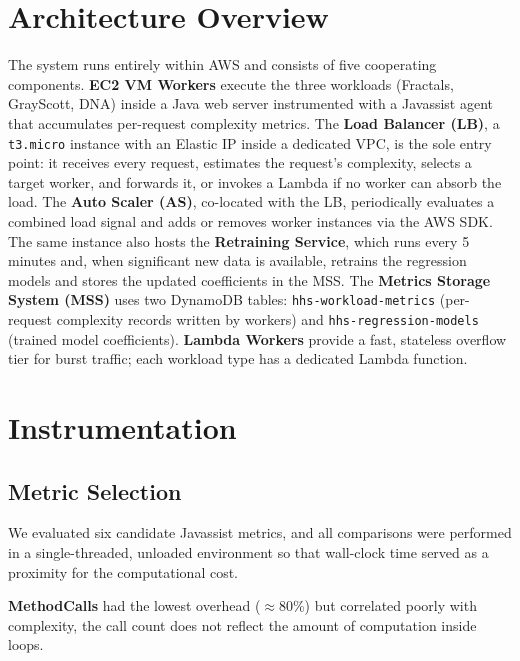 \documentclass[10pt]{article}
\begin{document}
\section{Architecture Overview}
The system runs entirely within AWS and consists of five cooperating
components. \textbf{EC2 VM Workers} execute the three workloads (Fractals,
GrayScott, DNA) inside a Java web server instrumented with a Javassist agent
that accumulates per-request complexity metrics. The \textbf{Load Balancer
	(LB)}, a \texttt{t3.micro} instance with an Elastic IP inside a dedicated VPC,
is the sole entry point: it receives every request, estimates the request's
complexity, selects a target worker, and forwards it, or invokes a Lambda if
no worker can absorb the load. The \textbf{Auto Scaler (AS)}, co-located with
the LB, periodically evaluates a combined load signal and adds or removes
worker instances via the AWS SDK\@. The same instance also hosts the
\textbf{Retraining Service}, which runs every 5 minutes and, when significant
new data is available, retrains the regression models and stores the updated
coefficients in the MSS\@. The \textbf{Metrics Storage System (MSS)} uses two
DynamoDB tables: \texttt{hhs-workload-metrics} (per-request complexity records
written by workers) and \texttt{hhs-regression-models} \\ (trained model
coefficients). \textbf{Lambda Workers} provide a fast, stateless overflow tier
for burst traffic; each workload type has a dedicated Lambda function.

\section{Instrumentation}

\subsection{Metric Selection}
We evaluated six candidate Javassist metrics, and all comparisons were
performed in a single-threaded, unloaded environment so that wall-clock time
served as a proximity for the computational cost.

\textbf{MethodCalls} had the lowest overhead ($\approx$80\%) but correlated poorly with complexity, the call count does not reflect the amount of computation inside loops.
\end{document}
